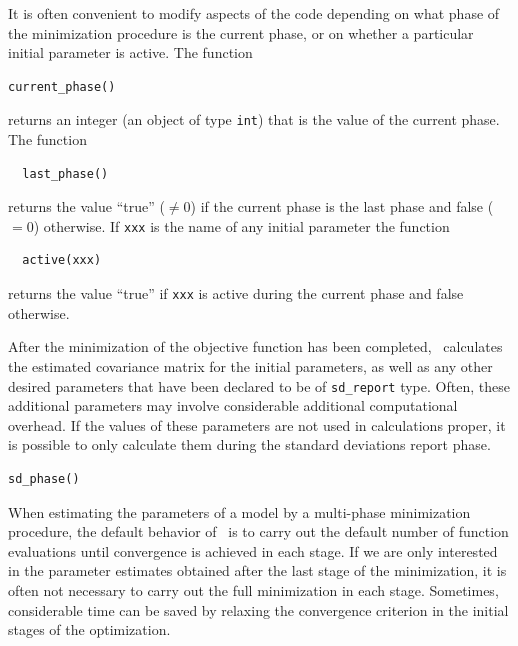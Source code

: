\documentclass{admbmanual}
\begin{document}
It is often convenient to modify aspects of the code depending on what
phase of the minimization procedure is the current phase, or on whether
a particular initial parameter is active. The function
\begin{lstlisting}
current_phase()
\end{lstlisting}
returns an integer (an object of type \texttt{int}) that is the
value of the current phase.
The function
\begin{lstlisting} 
  last_phase()
\end{lstlisting}
returns the value ``true'' ($\ne 0$) if the current phase is the
last phase and false ($=0$) otherwise. 
If \texttt{xxx} is the name of any initial parameter the function
\begin{lstlisting} 
  active(xxx) 
\end{lstlisting}
returns the value ``true'' if \texttt{xxx} is active
during the  current phase and false otherwise.

After the minimization of the objective function has been completed,
\ADM\ calculates the estimated covariance matrix for the
initial parameters, as well as any other desired parameters that
have been declared to be of \texttt{sd\_report} type. Often,
these additional parameters may involve
considerable additional computational overhead. If the values of 
these parameters are not used in calculations proper, it is possible to
only calculate them during the standard deviations report phase.

\begin{lstlisting} 
sd_phase()
\end{lstlisting}

When  estimating the parameters of a model by a multi-phase
minimization procedure, the default behavior of \ADM\ is to
carry out the default number of function evaluations until 
convergence is achieved in each stage. If we are only interested
in the parameter estimates obtained after the last stage of
the minimization, it is often not necessary to carry out the 
full minimization in each stage. Sometimes, considerable time can be
saved by relaxing the convergence criterion in the
initial stages of the optimization.
\end{document}
